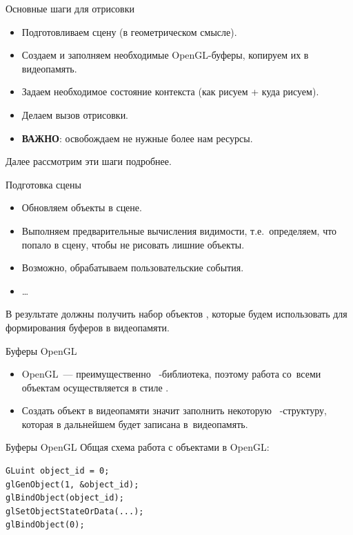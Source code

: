 \documentclass[aspectration=1610,t]{beamer}
\begin{document}
\begin{frame}[fragile]{Основные шаги для отрисовки}
    \begin{itemize}
        \item Подготовливаем сцену (в геометрическом смысле).
        \item Создаем и заполняем необходимые OpenGL-буферы, копируем их в видеопамять.
        \item Задаем необходимое состояние контекста (как рисуем + куда рисуем).
        \item Делаем вызов отрисовки.
        \item {\bf ВАЖНО}: освобождаем не нужные более нам ресурсы.
    \end{itemize}
    Далее рассмотрим эти шаги подробнее.
\end{frame}

\begin{frame}[fragile]{Подготовка сцены}
    \begin{itemize}
        \item Обновляем объекты в сцене.
        \item Выполняем предварительные вычисления видимости, 
            т.е.~определяем, что попало в сцену, чтобы не рисовать лишние объекты.
        \item Возможно, обрабатываем пользовательские события.
        \item \dots
    \end{itemize}
    В результате должны получить набор объектов \langcpp, 
        которые будем использовать для формирования буферов в видеопамяти.
\end{frame}

\begin{frame}[fragile]{Буферы OpenGL}
    \begin{itemize}
        \item OpenGL~--- преимущественно \langc~-библиотека, 
            поэтому работа со~всеми объектам осуществляется в стиле \langc.
        \item Создать объект в видеопамяти значит заполнить некоторую \langc~-структуру,
            которая в дальнейшем будет записана в~видеопамять.
    \end{itemize}
\end{frame}

\begin{frame}[fragile]{Буферы OpenGL}
    Общая схема работа с объектами в OpenGL:
        {\small \begin{lstlisting}
GLuint object_id = 0;
glGenObject(1, &object_id);
glBindObject(object_id);
glSetObjectStateOrData(...);
glBindObject(0);
        \end{lstlisting}}
\end{frame}
\end{document}
